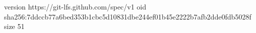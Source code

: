 version https://git-lfs.github.com/spec/v1
oid sha256:7ddccb77a6bed353b1cbc5d10831dbe244ef01b45e2222b7afb2dde0fdb5028f
size 51
